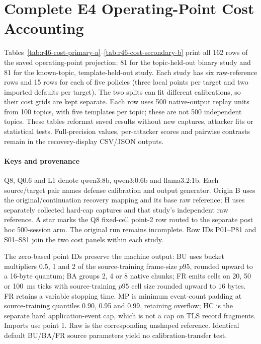 \section{Complete E4 Operating-Point Cost Accounting}\label{sec:r46-e4-costs}
Tables~\ref{tab:r46-cost-primary-a}--\ref{tab:r46-cost-secondary-b} print all 162 rows of the saved operating-point projection: 81 for the topic-held-out binary study and 81 for the known-topic, template-held-out study. Each study has six raw-reference rows and 15 rows for each of five policies (three local points per target and two imported defaults per target). The two splits can fit different calibrations, so their cost grids are kept separate. Each row uses 500 native-output replay units from 100 topics, with five templates per topic; these are not 500 independent topics. These tables reformat saved results without new captures, attacker fits or statistical tests. Full-precision values, per-attacker scores and pairwise contrasts remain in the recovery-display CSV/JSON outputs.

\paragraph{Keys and provenance}
Q8, Q0.6 and L1 denote qwen3:8b, qwen3:0.6b and llama3.2:1b. Each source/target pair names defense calibration and output generator. Origin B uses the original/continuation recovery mapping and its base raw reference; H uses separately collected hard-cap captures and that study's independent raw reference. A star marks the Q8 fixed-cell point-2 row routed to the separate post hoc 500-session arm. The original run remains incomplete. Row IDs P01--P81 and S01--S81 join the two cost panels within each study.

The zero-based point IDs preserve the machine output: BU uses bucket multipliers 0.5, 1 and 2 of the source-training frame-size $p95$, rounded upward to a 16-byte quantum; BA groups 2, 4 or 8 native chunks; FR emits cells on 20, 50 or 100~ms ticks with source-training $p95$ cell size rounded upward to 16 bytes. FR retains a variable stopping time. MP is minimum event-count padding at source-training quantiles 0.90, 0.95 and 0.99, retaining overflow; HC is the separate hard application-event cap, which is not a cap on TLS record fragments. Imports use point 1. Raw is the corresponding unshaped reference. Identical default BU/BA/FR source parameters yield no calibration-transfer test.

